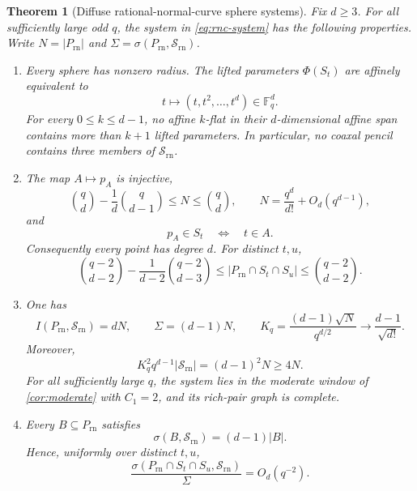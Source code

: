 \documentclass[11pt,letterpaper]{amsart}
\newtheorem{theorem}{Theorem}[section]
\theoremstyle{definition}
\theoremstyle{remark}
\newcommand{\1}{\mathbf 1}
\begin{document}
\begin{theorem}[Diffuse rational-normal-curve sphere systems]\label{thm:rnc-system}
Fix $d\ge3$.  For all sufficiently large odd $q$, the system in \eqref{eq:rnc-system} has the following properties.  Write $N=|P_{\mathrm{rn}}|$ and $\Sigma=\sigma(P_{\mathrm{rn}},\mathcal S_{\mathrm{rn}})$.
\begin{enumerate}[label=\textup{(\arabic*)}]
\item Every sphere has nonzero radius.  The lifted parameters $\Phi(S_t)$ are affinely equivalent to
\[
 t\longmapsto(t,t^2,\ldots,t^d)\in\mathbb F_q^d.
\]
For every $0\le k\le d-1$, no affine $k$-flat in their $d$-dimensional affine span contains more than $k+1$ lifted parameters.  In particular, no coaxal pencil contains three members of $\mathcal S_{\mathrm{rn}}$.
\item The map $A\mapsto p_A$ is injective,
\begin{equation}\label{eq:rnc-N-bounds}
 \binom qd-\frac1d\binom q{d-1}
 \le N\le\binom qd,
 \qquad
 N=\frac{q^d}{d!}+O_d(q^{d-1}),
\end{equation}
and
\begin{equation}\label{eq:rnc-incidence}
 p_A\in S_t\quad\Longleftrightarrow\quad t\in A.
\end{equation}
Consequently every point has degree $d$.  For distinct $t,u$,
\begin{equation}\label{eq:rnc-pair-count}
 \binom{q-2}{d-2}-\frac1{d-2}\binom{q-2}{d-3}
 \le |P_{\mathrm{rn}}\cap S_t\cap S_u|
 \le\binom{q-2}{d-2}.
\end{equation}
\item One has
\begin{equation}\label{eq:rnc-surplus}
 I(P_{\mathrm{rn}},\mathcal S_{\mathrm{rn}})=dN,
 \qquad
 \Sigma=(d-1)N,
 \qquad
 K_q=\frac{(d-1)\sqrt N}{q^{d/2}}
 \longrightarrow\frac{d-1}{\sqrt{d!}}.
\end{equation}
Moreover,
\begin{equation}\label{eq:rnc-lower-exact}
 K_q^2q^{d-1}|\mathcal S_{\mathrm{rn}}|=(d-1)^2N\ge4N.
\end{equation}
For all sufficiently large $q$, the system lies in the moderate window of \cref{cor:moderate} with $C_1=2$, and its rich-pair graph is complete.
\item Every $B\subseteq P_{\mathrm{rn}}$ satisfies
\begin{equation}\label{eq:rnc-uniform-excess}
 \sigma(B,\mathcal S_{\mathrm{rn}})=(d-1)|B|.
\end{equation}
Hence, uniformly over distinct $t,u$,
\begin{equation}\label{eq:rnc-no-atom}
 \frac{\sigma(P_{\mathrm{rn}}\cap S_t\cap S_u,\mathcal S_{\mathrm{rn}})}{\Sigma}
 =O_d(q^{-2}).
\end{equation}
\end{enumerate}
\end{theorem}
\end{document}
